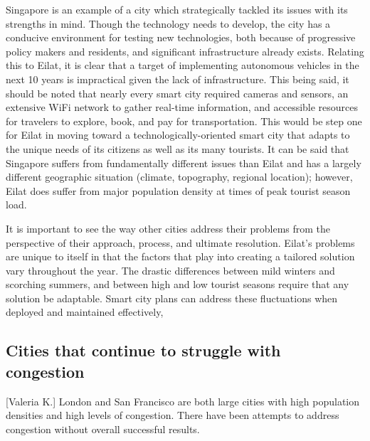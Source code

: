 \documentclass[12pt]{article}                               %
\begin{document}
Singapore is an example of a city which strategically tackled its issues with its strengths in mind. Though the technology needs to develop, the city has a conducive environment for testing new technologies, both because of progressive policy makers and residents, and significant infrastructure already exists. Relating this to Eilat, it is clear that a target of implementing autonomous vehicles in the next 10 years is impractical given the lack of infrastructure. This being said, it should be noted that nearly every smart city required cameras and sensors, an extensive WiFi network to gather real-time information, and accessible resources for travelers to explore, book, and pay for transportation. This would be step one for Eilat in moving toward a technologically-oriented smart city that adapts to the unique needs of its citizens as well as its many tourists. It can be said that Singapore suffers from fundamentally different issues than Eilat and has a largely different geographic situation (climate, topography, regional location); however, Eilat does suffer from major population density at times of peak tourist season load. 

It is important to see the way other cities address their problems from the perspective of their approach, process, and ultimate resolution. Eilat's problems are unique to itself in that the factors that play into creating a tailored solution vary throughout the year. The drastic differences between mild winters and scorching summers, and between high and low tourist seasons require that any solution be adaptable. Smart city plans can address these fluctuations when deployed and maintained effectively, 

\subsection{Cities that continue to struggle with congestion}[Valeria K.]
London and San Francisco are both large cities with high population densities and high levels of congestion. There have been attempts to address congestion without overall successful results. 
\end{document}
